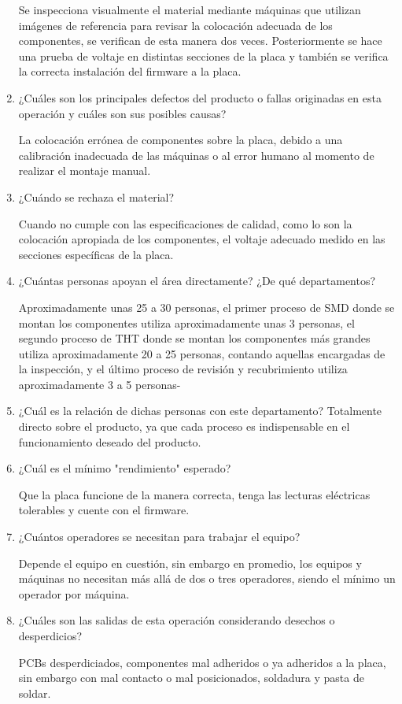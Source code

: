 \documentclass[12pt, letterpaper]{article}
\begin{document}
\begin{enumerate}
		Se inspecciona visualmente el material mediante máquinas que utilizan imágenes de referencia para revisar la colocación adecuada de los componentes, se verifican de esta manera dos veces. Posteriormente se hace una prueba de voltaje en distintas secciones de la placa y también se verifica la correcta instalación del firmware a la placa.

	\item ¿Cuáles son los principales defectos del producto o fallas originadas en esta operación y cuáles son sus posibles causas?

		La colocación errónea de componentes sobre la placa, debido a una calibración inadecuada de las máquinas o al error humano al momento de realizar el montaje manual.

	\item ¿Cuándo se rechaza el material?

		Cuando no cumple con las especificaciones de calidad, como lo son la colocación apropiada de los componentes, el voltaje adecuado medido en las secciones específicas de la placa.

	\item ¿Cuántas personas apoyan el área directamente? ¿De qué departamentos?

		Aproximadamente unas 25 a 30 personas, el primer proceso de SMD donde se montan los componentes utiliza aproximadamente unas 3 personas, el segundo proceso de THT donde se montan los componentes más grandes utiliza aproximadamente 20 a 25 personas, contando aquellas encargadas de la inspección, y el último proceso de revisión y recubrimiento utiliza aproximadamente 3 a 5 personas-

	\item ¿Cuál es la relación de dichas personas con este departamento?
		Totalmente directo sobre el producto, ya que cada proceso es indispensable en el funcionamiento deseado del producto.

	\item ¿Cuál es el mínimo "rendimiento" esperado?

		Que la placa funcione de la manera correcta, tenga las lecturas eléctricas tolerables y cuente con el firmware.

	\item ¿Cuántos operadores se necesitan para trabajar el equipo?

		Depende el equipo en cuestión, sin embargo en promedio, los equipos y máquinas no necesitan más allá de dos o tres operadores, siendo el mínimo un operador por máquina.

	\item ¿Cuáles son las salidas de esta operación considerando desechos o desperdicios?

		PCBs desperdiciados, componentes mal adheridos o ya adheridos a la placa, sin embargo con mal contacto o mal posicionados, soldadura y pasta de soldar.

\end{enumerate}

\renewcommand\refname{References}
\printbibliography
\end{document}
